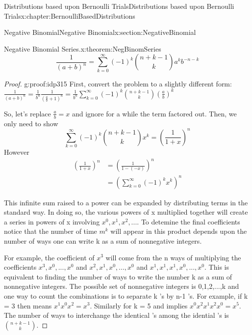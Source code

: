 \documentclass[oneside,10pt,]{book}
\numberwithin{equation}{section}
\begin{document}
\begin{chapterptx}{Distributions based upon Bernoulli Trials}{}{Distributions based upon Bernoulli Trials}{}{}{x:chapter:BernoulliBasedDistributions}
\begin{sectionptx}{Negative Binomial}{}{Negative Binomial}{}{}{x:section:NegativeBinomial}
\begin{theorem}{Negative Binomial Series.}{}{x:theorem:NegBinomSeries}
\begin{equation*}
\displaystyle \frac{1}{(a+b)^n} = \sum_{k=0}^{\infty} {(-1)^k \binom{n + k - 1}{k} a^k b^{-n-k}}
\end{equation*}
%
\end{theorem}
\begin{proof}{}{g:proof:idp315}
First, convert the problem to a slightly different form: \(\frac{1}{(a+b)^n} = \frac{1}{b^n} \frac{1}{(\frac{a}{b}+1)^n} 
= \frac{1}{b^n} \sum_{k=0}^{\infty} {(-1)^k \binom{n + k - 1}{k} \left ( \frac{a}{b} \right ) ^k}\)%
\par
So, let's replace \(\frac{a}{b} = x\) and ignore for a while the term factored out. Then, we only need to show%
\begin{equation*}
\sum_{k=0}^{\infty} {(-1)^k \binom{n + k - 1}{k} x^k} = \left ( \frac{1}{1+x} \right )^n 
\end{equation*}
However%
\begin{align*}
\left ( \frac{1}{1+x} \right )^n & = \left ( \frac{1}{1 - (-x)} \right )^n \\
& = \left ( \sum_{k=0}^{\infty} {(-1)^k x^k} \right )^n
\end{align*}
%
\par
This infinite sum raised to a power can be expanded by distributing terms in the standard way. In doing so, the various powers of x multiplied together will create a series in powers of x involving \(x^0, x^1, x^2, ...\). To detemine the final coefficients notice that the number of time \(m^k\) will appear in this product depends upon the number of ways one can write k as a sum of nonnegative integers.%
\par
For example, the coefficient of \(x^3\) will come from the n ways of multiplying the coefficients \(x^3, x^0, ..., x^0\) and \(x^2, x^1, x^0, ..., x^0\) and \(x^1, x^1, x^1, x^0,..., x^0\). This is equivalent to finding the number of ways to write the number k as a sum of nonnegative integers. The possible set of nonnegative integers is \textbraceleft{}0,1,2,...,k\textbraceright{} and one way to count the combinations is to separate k \textasteriskcentered{}'s by n-1 \textbar{}'s.  For example, if k = 3 then \textasteriskcentered{}\textbar{}\textbar{}\textasteriskcentered{}\textasteriskcentered{} means \(x^1 x^0 x^2 = x^3\). Similarly for k = 5 and \textbar{}\textasteriskcentered{}\textasteriskcentered{}\textbar{}\textasteriskcentered{}\textbar{}\textasteriskcentered{}\textasteriskcentered{}\textbar{} implies \(x^0 x^2 x^1 x^2 x^0 = x^5\).  The number of ways to interchange the identical \textasteriskcentered{}'s among the idential \textbar{}'s is \(\binom{n+k-1}{k}\).%

\end{proof}
\end{sectionptx}
\end{chapterptx}
\end{document}
